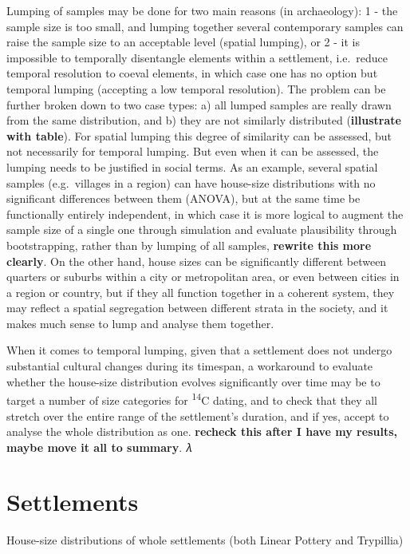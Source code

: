 \documentclass[
  12pt,
]{book}
\begin{document}
Lumping of samples may be done for two main reasons (in archaeology): 1 - the sample size is too small, and lumping together several contemporary samples can raise the sample size to an acceptable level (spatial lumping), or 2 - it is impossible to temporally disentangle elements within a settlement, i.e.~reduce temporal resolution to coeval elements, in which case one has no option but temporal lumping (accepting a low temporal resolution). The problem can be further broken down to two case types: a) all lumped samples are really drawn from the same distribution, and b) they are not similarly distributed (\textbf{illustrate with table}). For spatial lumping this degree of similarity can be assessed, but not necessarily for temporal lumping. But even when it can be assessed, the lumping needs to be justified in social terms. As an example, several spatial samples (e.g.~villages in a region) can have house-size distributions with no significant differences between them (ANOVA), but at the same time be functionally entirely independent, in which case it is more logical to augment the sample size of a single one through simulation and evaluate plausibility through bootstrapping, rather than by lumping of all samples, \textbf{rewrite this more clearly}. On the other hand, house sizes can be significantly different between quarters or suburbs within a city or metropolitan area, or even between cities in a region or country, but if they all function together in a coherent system, they may reflect a spatial segregation between different strata in the society, and it makes much sense to lump and analyse them together.

When it comes to temporal lumping, given that a settlement does not undergo substantial cultural changes during its timespan, a workaround to evaluate whether the house-size distribution evolves significantly over time may be to target a number of size categories for \textsuperscript{14}C dating, and to check that they all stretch over the entire range of the settlement's duration, and if yes, accept to analyse the whole distribution as one. \textbf{recheck this after I have my results, maybe move it all to summary}. 𝜆

\hypertarget{settlements}{%
\section{Settlements}\label{settlements}}

House-size distributions of whole settlements (both Linear Pottery and Trypillia)
\end{document}
